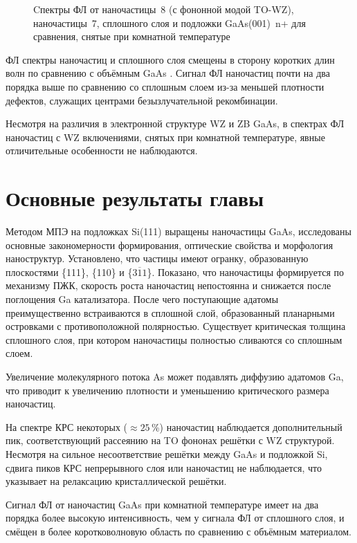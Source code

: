 \begin{figure}[ht]  \caption{Cпектры ФЛ от
		наночастицы~8 (с фононной модой TO-WZ), наночастицы~7, сплошного слоя и
		подложки GaAs(001)~n+ для сравнения, снятые при комнатной
температуре}\label{fig:Image_37} \end{figure}

ФЛ спектры наночастиц и сплошного слоя смещены в сторону коротких длин волн по
сравнению с объёмным GaAs \cite{Fu2004}. Сигнал ФЛ наночастиц почти на два
порядка выше по сравнению со сплошным слоем из-за меньшей плотности дефектов,
служащих центрами безызлучательной рекомбинации.

Несмотря на различия в электронной структуре WZ и ZB GaAs, в спектрах ФЛ
наночастиц с WZ включениями, снятых при комнатной температуре, явные
отличительные особенности не наблюдаются.

\section{Основные результаты главы}\label{sec:ch5/sec3}

Методом МПЭ на подложках Si(111) выращены наночастицы GaAs, исследованы
основные закономерности формирования, оптические свойства и морфология
наноструктур. Установлено, что частицы имеют огранку, образованную плоскостями
\{111\}, \{110\} и \{\(3\overline{1}1\)\}. Показано, что наночастицы
формируется по механизму ПЖК, скорость роста наночастиц непостоянна и снижается
после поглощения Ga катализатора. После чего поступающие адатомы
преимущественно встраиваются в сплошной слой, образованный планарными
островками с противоположной полярностью. Существует критическая толщина
сплошного слоя, при котором наночастицы полностью сливаются со сплошным слоем.

Увеличение молекулярного потока As может подавлять диффузию адатомов Ga, что
приводит к увеличению плотности и уменьшению критического размера наночастиц.

На спектре КРС некоторых (\(\approx 25\)\,\%) наночастиц наблюдается
дополнительный пик, соответствующий рассеянию на TO фононах решётки с WZ
структурой. Несмотря на сильное несоответствие решётки между GaAs и подложкой
Si, сдвига пиков КРС непрерывного слоя или наночастиц не наблюдается, что
указывает на релаксацию кристаллической решётки.

Сигнал ФЛ от наночастиц GaAs при комнатной температуре имеет на два порядка
более высокую интенсивность, чем у сигнала ФЛ от сплошного слоя, и смёщен в
более коротковолновую область по сравнению с объёмным материалом.

\FloatBarrier
